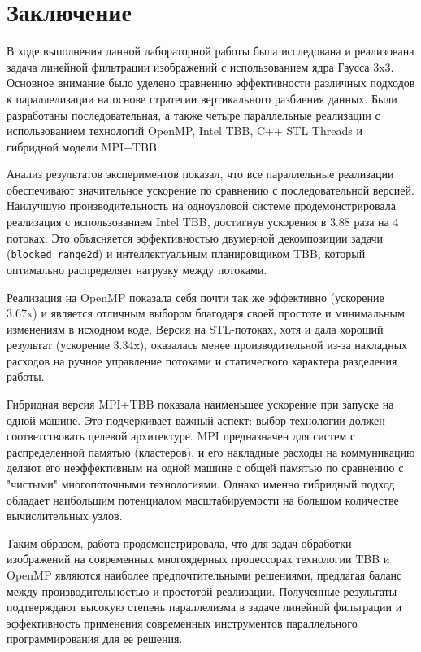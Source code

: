 \documentclass[12pt,a4paper]{extarticle}
\begin{document}
\newpage
\section{Заключение}
В ходе выполнения данной лабораторной работы была исследована и реализована задача линейной фильтрации изображений с использованием ядра Гаусса 3x3. Основное внимание было уделено сравнению эффективности различных подходов к параллелизации на основе стратегии вертикального разбиения данных. Были разработаны последовательная, а также четыре параллельные реализации с использованием технологий OpenMP, Intel TBB, C++ STL Threads и гибридной модели MPI+TBB.

Анализ результатов экспериментов показал, что все параллельные реализации обеспечивают значительное ускорение по сравнению с последовательной версией. Наилучшую производительность на одноузловой системе продемонстрировала реализация с использованием Intel TBB, достигнув ускорения в 3.88 раза на 4 потоках. Это объясняется эффективностью двумерной декомпозиции задачи (\lstinline{blocked_range2d}) и интеллектуальным планировщиком TBB, который оптимально распределяет нагрузку между потоками.

Реализация на OpenMP показала себя почти так же эффективно (ускорение 3.67x) и является отличным выбором благодаря своей простоте и минимальным изменениям в исходном коде. Версия на STL-потоках, хотя и дала хороший результат (ускорение 3.34x), оказалась менее производительной из-за накладных расходов на ручное управление потоками и статического характера разделения работы.

Гибридная версия MPI+TBB показала наименьшее ускорение при запуске на одной машине. Это подчеркивает важный аспект: выбор технологии должен соответствовать целевой архитектуре. MPI предназначен для систем с распределенной памятью (кластеров), и его накладные расходы на коммуникацию делают его неэффективным на одной машине с общей памятью по сравнению с "чистыми" многопоточными технологиями. Однако именно гибридный подход обладает наибольшим потенциалом масштабируемости на большом количестве вычислительных узлов.

Таким образом, работа продемонстрировала, что для задач обработки изображений на современных многоядерных процессорах технологии TBB и OpenMP являются наиболее предпочтительными решениями, предлагая баланс между производительностью и простотой реализации. Полученные результаты подтверждают высокую степень параллелизма в задаче линейной фильтрации и эффективность применения современных инструментов параллельного программирования для ее решения.
\end{document}
